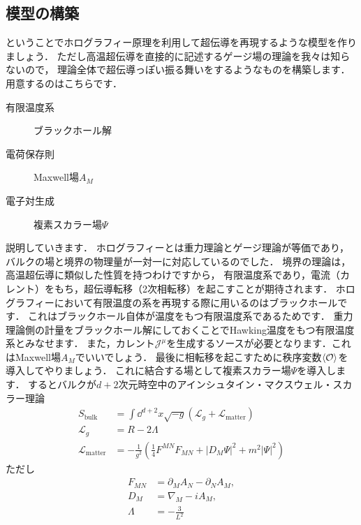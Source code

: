 \documentclass[b5paper,11pt,dvipdfmx]{jsarticle}
\numberwithin{equation}{section}
\theoremstyle{definition}
\begin{document}
\subsection{模型の構築}
ということでホログラフィー原理を利用して超伝導を再現するような模型を作りましょう．
ただし高温超伝導を直接的に記述するゲージ場の理論を我々は知らないので，
理論全体で超伝導っぽい振る舞いをするようなものを構築します．
用意するのはこちらです．
\begin{description}
    \item[有限温度系] ブラックホール解
    \item[電荷保存則] Maxwell場$A_M$
    \item[電子対生成] 複素スカラー場$\Psi$
\end{description}
説明していきます．
ホログラフィーとは重力理論とゲージ理論が等価であり，バルクの場と境界の物理量が一対一に対応しているのでした．
境界の理論は，高温超伝導に類似した性質を持つわけですから，
有限温度系であり，電流（カレント）をもち，超伝導転移（2次相転移）を起こすことが期待されます．
ホログラフィーにおいて有限温度の系を再現する際に用いるのはブラックホールです．
これはブラックホール自体が温度をもつ有限温度系であるためです．
重力理論側の計量をブラックホール解にしておくことでHawking温度をもつ有限温度系とみなせます．
また，カレント$\mathcal{J}^\mu$を生成するソースが必要となります．これはMaxwell場$A_M$でいいでしょう．
最後に相転移を起こすために秩序変数$\ev{\mathcal{O}}$を導入してやりましょう．
これに結合する場として複素スカラー場$\Psi$を導入します．
するとバルクが$d+2$次元時空中のアインシュタイン・マクスウェル・スカラー理論
\begin{equation}
    \begin{split}
        S_{\text{bulk}}
        &= \int \dd^{d+2} x \sqrt{-g} \left( \mathcal{L}_g + \mathcal{L}_{\text{matter}} \right)\\
        \mathcal{L}_{g}
        &= R - 2 \Lambda\\
        \mathcal{L}_{\text{matter}}
        &= - \frac{1}{g^2} \left( \frac{1}{4} F^{MN} F_{MN} + |D_M \Psi|^2 + m^2 |\Psi|^2 \right)
    \end{split}
\end{equation}
ただし
\begin{equation}
    \begin{split}
        F_{MN} &= \partial_M A_N - \partial_N A_M,\\
        D_M &= \nabla_M - i A_M,\\
        \Lambda &= - \frac{3}{L^2}
    \end{split}
\end{equation}
\end{document}
